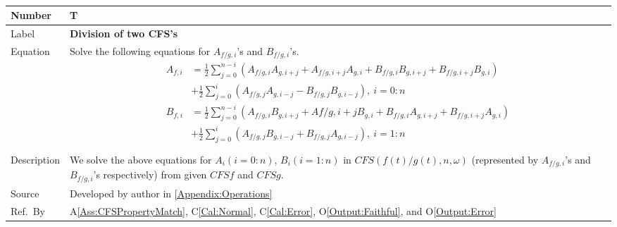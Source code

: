 \documentclass[12pt]{article}
\newcommand{\colAwidth}{0.13\textwidth}
\newcommand{\colBwidth}{0.82\textwidth}
\newcounter{theorynum} %
\newcommand{\aref}[1]{A\ref{#1}}
\newcommand{\calref}[1]{C\ref{#1}}
\newcommand{\oref}[1]{O\ref{#1}}
\begin{document}
~\newline
\noindent
\begin{minipage}{\textwidth}
	\renewcommand*{\arraystretch}{1.5}
	\begin{tabular}{| p{\colAwidth} | p{\colBwidth}|}
		\hline
		\rowcolor[gray]{0.9}
		Number& T{theorynum}\thetheorynum 
		\label{T:Division}\\
		\hline
		Label&\bf Division of two CFS's\\
		\hline
		Equation& Solve the following equations for $A_{f/g, i}$'s 
		and $B_{f/g, i}$'s.   
		\begin{equation}
		\begin{aligned}
		A_{f, i}&=\frac{1}{2}\sum_{j=0}^{n-i}(A_{f/g,i}A_{g,i+j}
		+A_{f/g, i+j}A_{g, i}+B_{f/g,i}B_{g,i+j}+B_{f/g,i+j}B_{g,i})\\
		&+\frac{1}{2}\sum_{j=0}^{i}(A_{f/g,j}A_{g,i-j}-B_{f/g,j}B_{g,i-j}),
		~i=0:n\\
		B_{f, i}&=\frac{1}{2}\sum_{j=0}^{n-i}(A_{f/g,i}B_{g,i+j}
		+A{f/g, i+j}B_{g, i}+B_{f/g,i}A_{g,i+j}+B_{f/g,i+j}A_{g,i})\\
		&+\frac{1}{2}\sum_{j=0}^{i}(A_{f/g,j}B_{g,i-j}+B_{f/g,j}A_{g,i-j}),
		~i=1:n\\
		\end{aligned}
		\end{equation}\\
		\hline
		Description & We solve the above equations for 
		$A_i(i=0:n)$, $B_i(i=1:n)$ in $\mathit{CFS}(f(t)/g(t), n, \omega)$ 
		(represented by $A_{f/g, i}$'s and $B_{f/g, i}$'s respectively) 
		from given $\mathit{CFSf}$ and $\mathit{CFSg}$.\\
		\hline
		Source & Developed by author in \autoref{Appendix:Operations}\\
		\hline
		Ref.\ By & \aref{Ass:CFSPropertyMatch}, \calref{Cal:Normal}, 
		\calref{Cal:Error}, \oref{Output:Faithful}, 
		and \oref{Output:Error}\\
		\hline
	\end{tabular}
\end{minipage}\\
\end{document}
